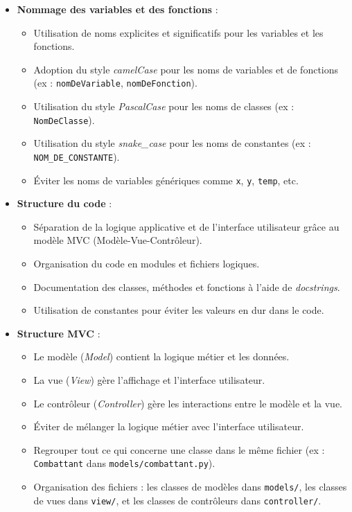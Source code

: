 \documentclass{article}
\begin{document}
\begin{itemize}
    \item \textbf{Nommage des variables et des fonctions} :
    \begin{itemize}
        \item Utilisation de noms explicites et significatifs pour les variables et les fonctions.
        \item Adoption du style \textit{camelCase} pour les noms de variables et de fonctions (ex : \texttt{nomDeVariable}, \texttt{nomDeFonction}).
        \item Utilisation du style \textit{PascalCase} pour les noms de classes (ex : \texttt{NomDeClasse}).
        \item Utilisation du style \textit{snake\_case} pour les noms de constantes (ex : \texttt{NOM\_DE\_CONSTANTE}).
        \item Éviter les noms de variables génériques comme \texttt{x}, \texttt{y}, \texttt{temp}, etc.
    \end{itemize}

    \item \textbf{Structure du code} :
    \begin{itemize}
        \item Séparation de la logique applicative et de l'interface utilisateur grâce au modèle MVC (Modèle-Vue-Contrôleur).
        \item Organisation du code en modules et fichiers logiques.
        \item Documentation des classes, méthodes et fonctions à l'aide de \textit{docstrings}.
        \item Utilisation de constantes pour éviter les valeurs en dur dans le code.
    \end{itemize}

    \item \textbf{Structure MVC} :
    \begin{itemize}
        \item Le modèle (\textit{Model}) contient la logique métier et les données.
        \item La vue (\textit{View}) gère l'affichage et l'interface utilisateur.
        \item Le contrôleur (\textit{Controller}) gère les interactions entre le modèle et la vue.
        \item Éviter de mélanger la logique métier avec l'interface utilisateur.
        \item Regrouper tout ce qui concerne une classe dans le même fichier (ex : \texttt{Combattant} dans \texttt{models/combattant.py}).
        \item Organisation des fichiers : les classes de modèles dans \texttt{models/}, les classes de vues dans \texttt{view/}, et les classes de contrôleurs dans \texttt{controller/}.
    \end{itemize}


\end{itemize}
\end{document}
